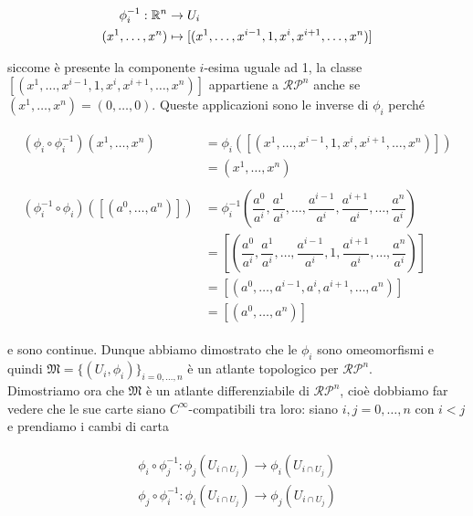 \begin{align}
	\begin{split}
		\phi_{i}^{-1} : \mathbb{R}^{n} &\to U_{i}\\
		(x^{1},\dots,x^{n}) &\mapsto [(x^{1},\dots,x^{i-1},1,x^{i},x^{i+1},\dots,x^{n})]
	\end{split}
\end{align}

siccome è presente la componente $ i $-esima uguale ad 1, la classe $ [(x^{1},\dots,x^{i-1},1,x^{i},x^{i+1},\dots,x^{n})] $ appartiene a $ \mathcal{RP}^{n} $ anche se $ (x^{1},\dots,x^{n}) = (0,\dots,0) $. Queste applicazioni sono le inverse di $ \phi_{i} $ perché

\begin{align}
	\begin{split}
		(\phi_{i} \circ \phi_{i}^{-1})(x^{1},\dots,x^{n}) &= \phi_{i}([(x^{1},\dots,x^{i-1},1,x^{i},x^{i+1},\dots,x^{n})])\\
		&= (x^{1},\dots,x^{n})\\\\
		(\phi^{-1}_{i} \circ \phi_{i})([(a^{0},\dots,a^{n})]) &= \phi_{i}^{-1} \left( \dfrac{a^{0}}{a^{i}}, \dfrac{a^{1}}{a^{i}}, \dots, \dfrac{a^{i-1}}{a^{i}}, \dfrac{a^{i+1}}{a^{i}}, \dots, \dfrac{a^{n}}{a^{i}} \right)\\
		&= \left[ \left( \dfrac{a^{0}}{a^{i}}, \dfrac{a^{1}}{a^{i}}, \dots, \dfrac{a^{i-1}}{a^{i}}, 1, \dfrac{a^{i+1}}{a^{i}}, \dots, \dfrac{a^{n}}{a^{i}} \right) \right]\\
		&= [(a^{0},\dots,a^{i-1},a^{i},a^{i+1},\dots,a^{n})]\\
		&= [(a^{0},\dots,a^{n})]
	\end{split}
\end{align}

e sono continue. Dunque abbiamo dimostrato che le $ \phi_{i} $ sono omeomorfismi e quindi $ \mathfrak{M} = \{(U_{i},\phi_{i})\}_{i=0,\dots,n} $ è un atlante topologico per $ \mathcal{RP}^{n} $.\\
Dimostriamo ora che $ \mathfrak{M} $ è un atlante differenziabile di $ \mathcal{RP}^{n} $, cioè dobbiamo far vedere che le sue carte siano $ C^{\infty} $-compatibili tra loro: siano $ i,j=0,\dots,n $ con $ i<j $ e prendiamo i cambi di carta

\begin{align}
	\begin{split}
		\phi_{i} \circ \phi_{j}^{-1} : \phi_{j}(U_{i \cap U_{j}}) \to \phi_{i}(U_{i \cap U_{j}})\\
		\phi_{j} \circ \phi_{i}^{-1} : \phi_{i}(U_{i \cap U_{j}}) \to \phi_{j}(U_{i \cap U_{j}})
	\end{split}
\end{align}


